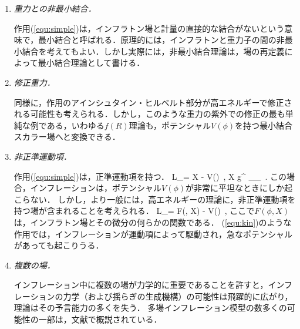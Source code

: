 \begin{enumerate}
\item {\it 重力との非最小結合．}

作用(\ref{equ:simple})は，インフラトン場と計量の直接的な結合がないという意味で，最小結合と呼ばれる．原理的には，インフラトンと重力子の間の非最小結合を考えてもよい．しかし実際には，非最小結合理論は，場の再定義によって最小結合理論として書ける．

\item {\it 修正重力．}

同様に，作用のアインシュタイン・ヒルベルト部分が高エネルギーで修正される可能性も考えられる．しかし，このような重力の紫外での修正の最も単純な例である，いわゆる$f(R)$理論も，ポテンシャル$V(\phi)$を持つ最小結合スカラー場へと変換できる．

\item {\it 非正準運動項．}

作用(\ref{equ:simple})は，正準運動項を持つ．
\beq
{\cal L}_\phi = X - V(\phi)\, , \qquad X \equiv {} g^{\mu \nu} \partial_\mu \phi \partial_\nu \phi\, .
\eeq
この場合，インフレーションは，ポテンシャル$V(\phi)$が非常に平坦なときにしか起こらない．
しかし，より一般には，高エネルギーの理論に，非正準運動項を持つ場が含まれることを考えられる．
\beq
\label{equ:kin}
{\cal L}_\phi = F(\phi, X) - V(\phi)\, , 
\eeq
ここで$F(\phi,X)$は，インフラトン場とその微分の何らかの関数である．
(\ref{equ:kin})のような作用では，インフレーションが運動項によって駆動され，急なポテンシャルがあっても起こりうる．

\item {\it 複数の場．}

インフレーション中に複数の場が力学的に重要であることを許すと，インフレーションの力学（および揺らぎの生成機構）の可能性は飛躍的に広がり，理論はその予言能力の多くを失う．
多場インフレーション模型の数多くの可能性の一部は，文献\cite{WandsMulti}で概説されている．
\end{enumerate}









